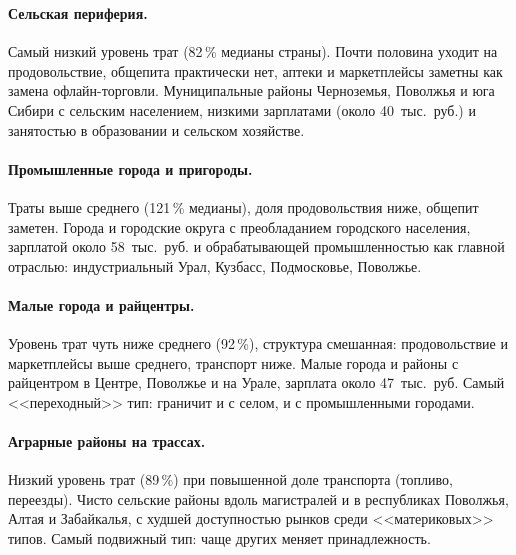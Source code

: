 \documentclass[11pt,a4paper]{article}
\newcommand{\rub}{руб.}
\begin{document}
\begin{table}[htbp]
\begin{tabularx}{\textwidth}
 \\
 \\
 \\
 \\
\bottomrule
\end{tabularx}
\end{table}

\paragraph{Сельская периферия.} Самый низкий уровень трат (82\,\% медианы страны). Почти половина уходит на продовольствие, общепита практически нет, аптеки и маркетплейсы заметны как замена офлайн-торговли. Муниципальные районы Черноземья, Поволжья и юга Сибири с сельским населением, низкими зарплатами (около 40~тыс.~\rub) и занятостью в образовании и сельском хозяйстве.

\paragraph{Промышленные города и пригороды.} Траты выше среднего (121\,\% медианы), доля продовольствия ниже, общепит заметен. Города и городские округа с преобладанием городского населения, зарплатой около 58~тыс.~\rub{} и обрабатывающей промышленностью как главной отраслью: индустриальный Урал, Кузбасс, Подмосковье, Поволжье.

\paragraph{Малые города и райцентры.} Уровень трат чуть ниже среднего (92\,\%), структура смешанная: продовольствие и маркетплейсы выше среднего, транспорт ниже. Малые города и районы с райцентром в Центре, Поволжье и на Урале, зарплата около 47~тыс.~\rub{} Самый <<переходный>> тип: граничит и с селом, и с промышленными городами.

\paragraph{Аграрные районы на трассах.} Низкий уровень трат (89\,\%) при повышенной доле транспорта (топливо, переезды). Чисто сельские районы вдоль магистралей и в республиках Поволжья, Алтая и Забайкалья, с худшей доступностью рынков среди <<материковых>> типов. Самый подвижный тип: чаще других меняет принадлежность.
\end{document}
